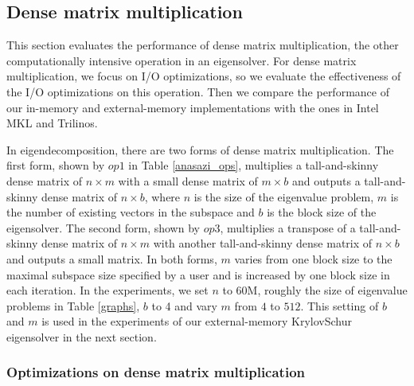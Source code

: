 %		
%		

\subsection{Dense matrix multiplication}

This section evaluates the performance of dense matrix multiplication,
the other computationally intensive operation in an eigensolver.
For dense matrix multiplication, we focus on I/O optimizations, so we evaluate
the effectiveness of the I/O optimizations on this operation. Then we
compare the performance of our in-memory and external-memory
implementations with the ones in Intel MKL and Trilinos.

In eigendecomposition, there are two forms of dense matrix multiplication.
The first form, shown by $op1$ in Table \ref{anasazi_ops}, multiplies
a tall-and-skinny dense matrix of $n \times m$
with a small dense matrix of $m \times b$ and outputs a tall-and-skinny dense
matrix of $n \times b$, where $n$ is the size of the eigenvalue problem,
$m$ is the number of existing vectors in the subspace and $b$ is the block
size of the eigensolver. The second form, shown by $op3$, multiplies
a transpose of a tall-and-skinny dense matrix of $n \times m$ with another
tall-and-skinny dense matrix of $n \times b$ and outputs a small matrix.
In both forms, $m$ varies from one block size to the maximal subspace size
specified by a user and is increased by one block size in each
iteration. In the experiments, we set $n$ to 60M, roughly the size of
eigenvalue problems in Table \ref{graphs}, $b$ to 4 and vary $m$
from $4$ to $512$. This setting of $b$ and $m$ is used in the experiments
of our external-memory KrylovSchur eigensolver in the next section.

\subsubsection{Optimizations on dense matrix multiplication}

